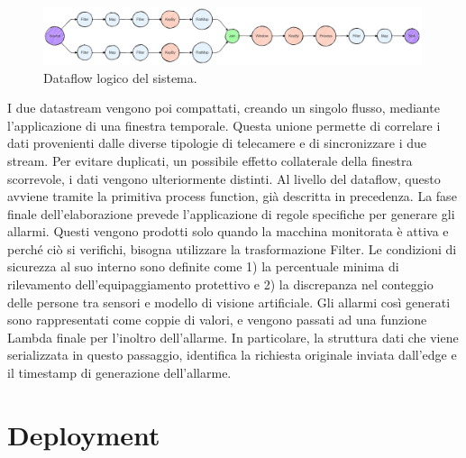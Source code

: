 \vspace{0.5cm}
\begin{figure}[htbp]
    \centering
    \includegraphics[width=0.99\textwidth]{figures/system-logical-dataflow-graph.png}
    \caption{Dataflow logico del sistema.} 
    \label{fig:system-dataflow}
\end{figure}

I due datastream vengono poi compattati, creando un singolo flusso, mediante l'applicazione di una finestra temporale. Questa unione permette di correlare i dati provenienti dalle diverse tipologie di telecamere e di sincronizzare i due stream. Per evitare duplicati, un possibile effetto collaterale della finestra scorrevole, i dati vengono ulteriormente distinti. Al livello del dataflow, questo avviene tramite la primitiva process function, già descritta in precedenza. La fase finale dell'elaborazione prevede l'applicazione di regole specifiche per generare gli allarmi. Questi vengono prodotti solo quando la macchina monitorata è attiva e perché ciò si verifichi, bisogna utilizzare la trasformazione Filter. Le condizioni di sicurezza al suo interno sono definite come 1) la percentuale minima di rilevamento dell'equipaggiamento protettivo e 2) la discrepanza nel conteggio delle persone tra sensori e modello di visione artificiale. Gli allarmi così generati sono rappresentati come coppie di valori, e vengono passati ad una funzione Lambda finale per l'inoltro dell'allarme. In particolare, la struttura dati che viene serializzata in questo passaggio, identifica la richiesta originale inviata dall'edge e il timestamp di generazione dell'allarme.


\newpage
\section{Deployment}

